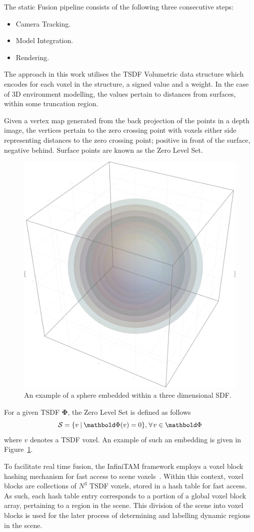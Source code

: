 The static Fusion pipeline consists of the following three consecutive steps:
\begin{itemize}
  \item Camera Tracking.
  \item Model Integration.
  \item Rendering.
\end{itemize}

The approach in this work utilises the TSDF Volumetric data structure which
encodes for each voxel in the structure, a signed value and a weight.
In the case of 3D environment modelling, the values pertain to distances from
surfaces, within some truncation region.

Given a vertex map generated from the back projection of the points in a depth
image, the vertices pertain to the zero crossing point with voxels either side
representing distances to the zero crossing point; positive in front of the
surface, negative behind. Surface points are known as the Zero Level Set.
\begin{figure}[h]
  \label{fig:sdf_example}
  \centering
  \includegraphics[width=.5\linewidth]{figures/moseg/3d_sdf.eps}
  \caption[Signed Distance Function]{An example of a sphere embedded within a 
  three dimensional SDF.}
\end{figure}

For a given TSDF \(\bm{\Phi}\), the Zero Level Set is defined as follows
\begin{equation}
  \label{eqn:zero_level_definition}
  \mathcal{S} = \{v \given \bm{\Phi}(v) = 0\}, 
  \mkern2mu \forall \mkern2mu v \in \bm{\Phi}
\end{equation}
where \(v\) denotes a TSDF voxel. An example of such an embedding is given in
Figure~\ref{fig:sdf_example}.

To facilitate real time fusion, the InfiniTAM framework employs a voxel block
hashing mechanism for fast access to scene voxels~\cite{NieBner2013}. Within
this context, voxel blocks are collections of \(N^{3}\) TSDF voxels, stored in a 
hash table for fast access. As such, each hash table entry corresponds to a portion 
of a global voxel block array, pertaining to a region in the scene. This division 
of the scene into voxel blocks is used for the later process of determining and 
labelling dynamic regions in the scene.

